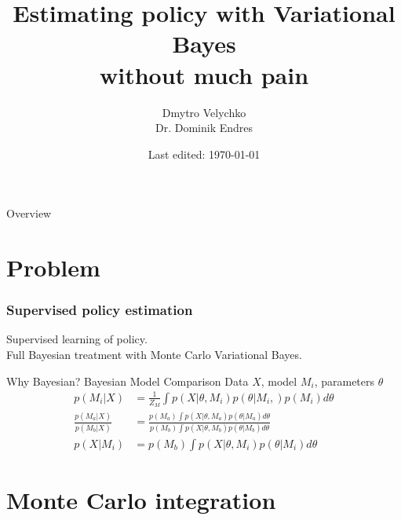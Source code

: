 \documentclass[xcolor=svgnames,table]{beamer}
\title{Estimating policy with Variational Bayes \\ without much pain}
\subtitle{}
\institute{Theoretical Neuroscience lab \\ Philipps-Universit\"{a}t Marburg}
\author[Dmytro Velychko]{Dmytro Velychko\\{\small Dr. Dominik Endres}}
\date{Last edited: \today}
\begin{document}
\begin{frame}
\titlepage
\end{frame}	

\begin{frame}{Overview}
\tableofcontents
\end{frame}

\section{Problem}

\begin{frame}
\frametitle{Supervised policy estimation}
\begin{center}
\scalebox{0.5}{
  
}
\end{center}
Supervised learning of policy.\\
Full Bayesian treatment with Monte Carlo Variational Bayes.
\end{frame}


\begin{frame}[fragile]{Why Bayesian? Bayesian Model Comparison}
Data $X$,  model $M_i$, parameters $\theta$
\begin{align}
    p(M_i | X) &= \frac{1}{Z_M} \int p(X | \theta, M_i) p(\theta | M_i,) p(M_i) d\theta \\
    \frac{p(M_a | X)}{p(M_b | X)} &= \frac{p(M_a) \int p(X | \theta, M_a) p(\theta | M_a)d\theta  }{p(M_b) \int p(X | \theta, M_b) p(\theta | M_b)d\theta} \\
    p(X | M_i) &= p(M_b) \int p(X | \theta, M_i) p(\theta | M_i)d\theta
\end{align}
\end{frame}




\section{Monte Carlo integration}
\end{document}

